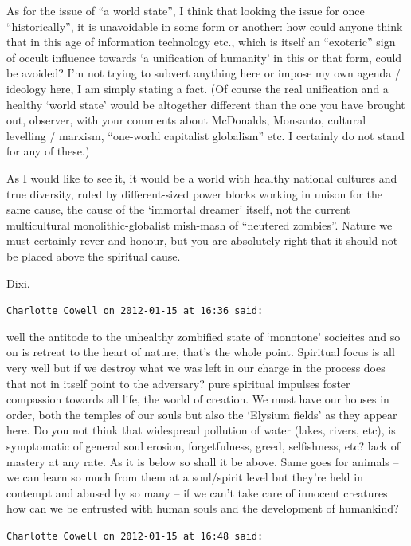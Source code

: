 \begin{footnotesize}
\begin{sffamily}
As for the issue of ``a world state'', I think that looking the issue for once ``historically'', it is unavoidable in some form or another: how could anyone think that in this age of information technology etc., which is itself an ``exoteric'' sign of occult influence towards `a unification of humanity' in this or that form, could be avoided? I'm not trying to subvert anything here or impose my own agenda / ideology here, I am simply stating a fact. (Of course the real unification and a healthy `world state' would be altogether different than the one you have brought out, observer, with your comments about McDonalds, Monsanto, cultural levelling / marxism, ``one-world capitalist globalism'' etc. I certainly do not stand for any of these.)

As I would like to see it, it would be a world with healthy national cultures and true diversity, ruled by different-sized power blocks working in unison for the same cause, the cause of the `immortal dreamer' itself, not the current multicultural monolithic-globalist mish-mash of ``neutered zombies''. Nature we must certainly rever and honour, but you are absolutely right that it should not be placed above the spiritual cause.

Dixi.

\hfill

\texttt{Charlotte Cowell on 2012-01-15 at 16:36 said:}

well the antitode to the unhealthy zombified state of `monotone' socieites and so on is retreat to the heart of nature, that's the whole point. Spiritual focus is all very well but if we destroy what we was left in our charge in the process does that not in itself point to the adversary? pure spiritual impulses foster compassion towards all life, the world of creation. We must have our houses in order, both the temples of our souls but also the `Elysium fields' as they appear here. Do you not think that widespread pollution of water (lakes, rivers, etc), is symptomatic of general soul erosion, forgetfulness, greed, selfishness, etc? lack of mastery at any rate. As it is below so shall it be above. Same goes for animals -- we can learn so much from them at a soul/spirit level but they're held in contempt and abused by so many -- if we can't take care of innocent creatures how can we be entrusted with human souls and the development of humankind?

\hfill

\texttt{Charlotte Cowell on 2012-01-15 at 16:48 said:}


\end{sffamily}
\end{footnotesize}
